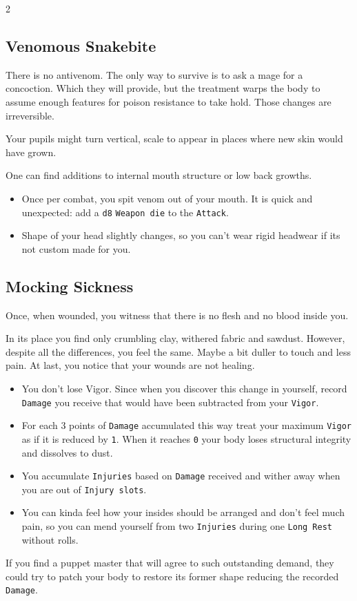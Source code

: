 \documentclass{osr-template/zine}
\begin{document}
\begin{multicols*}{2}

\subsection*{Venomous Snakebite}

There is no antivenom. The only way to survive is to ask a mage for a concoction.
Which they will provide, but the treatment warps the body to assume enough features for poison resistance to take hold.
Those changes are irreversible.

Your pupils might turn vertical, scale to appear in places where new skin would have grown.

One can find additions to internal mouth structure or low back growths.

\begin{itemize}[nosep]
    \item Once per combat, you spit venom out of your mouth. It is quick and unexpected: add a \texttt{d8} \texttt{Weapon die} to the \texttt{Attack}.
    \item Shape of your head slightly changes, so you can't wear rigid headwear if its not custom made for you.
\end{itemize}


\subsection*{Mocking Sickness}

Once, when wounded, you witness that there is no flesh and no blood inside you.

In its place you find only crumbling clay, withered fabric and sawdust.
However, despite all the differences, you feel the same. Maybe a bit duller to touch and less pain.
At last, you notice that your wounds are not healing.

\begin{itemize}[nosep]
    \item You don't lose Vigor. Since when you discover this change in yourself, record \texttt{Damage} you receive that would have been subtracted from your \texttt{Vigor}.
    \item For each 3 points of \texttt{Damage} accumulated this way treat your maximum \texttt{Vigor} as if it is reduced by \texttt{1}. When it reaches \texttt{0} your body loses structural integrity and dissolves to dust.
    \item You accumulate \texttt{Injuries} based on \texttt{Damage} received and wither away when you are out of \texttt{Injury slots}.
    \item You can kinda feel how your insides should be arranged and don't feel much pain, so you can mend yourself from two \texttt{Injuries} during one \texttt{Long Rest} without rolls.
\end{itemize}
If you find a puppet master that will agree to such outstanding demand, they could try to patch your body to restore its former shape reducing the recorded \texttt{Damage}.


\end{multicols*}
\end{document}
